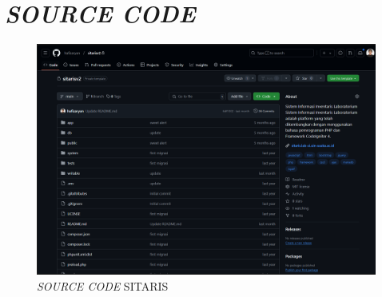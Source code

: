 %
%
%
%


\renewcommand{\thepage}{D - \arabic{page}}
\chapter{\textit{SOURCE CODE}}
\begin{figure}[h]
	\centering
	\includegraphics[width=0.82\linewidth]{konten/gambar/source-code.png}
	\caption{\textit{SOURCE CODE} SITARIS}
	\label{fig:source-code}
\end{figure}